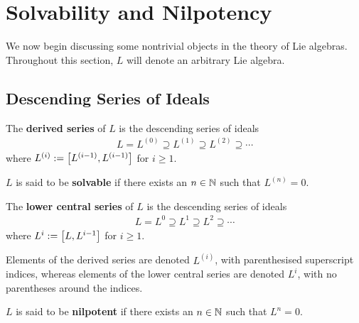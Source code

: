 \section{Solvability and Nilpotency}

We now begin discussing some nontrivial objects in the theory of Lie algebras. Throughout this section, $L$ will denote an arbitrary Lie algebra.

\subsection{Descending Series of Ideals}

\begin{boxdefinition}
    The \textbf{derived series} of $L$ is the descending series of ideals
    \begin{align*}
        L = L^{(0)} \supseteq L^{(1)} \supseteq L^{(2)} \supseteq \cdots %
    \end{align*}
    where $L^{(i)} := \left[ L^{(i - 1)}, L^{(i-1)} \right]$ for $i \geq 1$. %
\end{boxdefinition}

\begin{boxdefinition}[Solvability]
    $L$ is said to be \textbf{solvable} if there exists an $n \in \mathbb{N}$ such that $L^{(n)} = 0$.
\end{boxdefinition}

\begin{boxdefinition}
    The \textbf{lower central series} of $L$ is the descending series of ideals
    \begin{align*}
        L = L^{0} \supseteq L^{1} \supseteq L^{2} \supseteq \cdots %
    \end{align*}
    where $L^{i} := \left[ L, L^{i-1} \right]$ for $i \geq 1$. %
\end{boxdefinition}

\begin{boxconvention}
    Elements of the derived series are denoted $L^{(i)}$, with parenthesised superscript indices, whereas elements of the lower central series are denoted $L^{i}$, with no parentheses around the indices.
\end{boxconvention}

\begin{boxdefinition}[Nilpotency]
    $L$ is said to be \textbf{nilpotent} if there exists an $n \in \mathbb{N}$ such that $L^{n} = 0$.
\end{boxdefinition}

